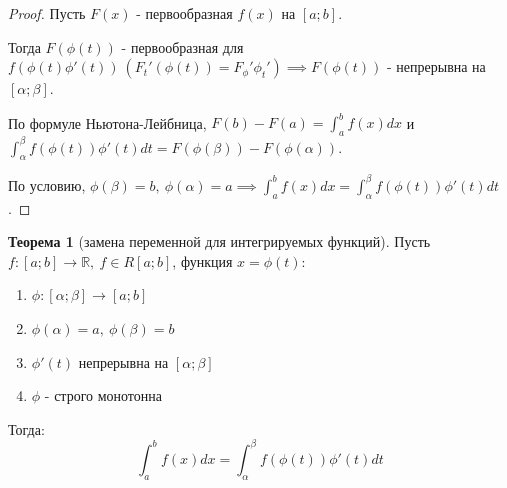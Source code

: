 \documentclass{report}
\theoremstyle{definition}
\newtheorem{theorem}{Теорема}[section]
\begin{document}
\begin{proof}
  Пусть $F(x)$ - первообразная $f(x)$ на $[a;b]$.

  Тогда $F(\phi(t))$ - первообразная для $f(\phi(t)\phi'(t)) \ (F_{t}'(\phi(t))
    = F_{\phi}'\phi_{t}') \implies F(\phi(t))$ - непрерывна на $[\alpha;\beta]$.

  По формуле Ньютона-Лейбница, $F(b) - F(a) = \int_{a}^{b}f(x)dx$ и $\int_{\alpha}
    ^{\beta}f(\phi(t))\phi'(t)dt = F(\phi(\beta)) - F(\phi(\alpha))$.

  По условию, $\phi(\beta) = b, \ \phi(\alpha) = a \implies \int_{a}^{b}f(x)dx =
    \int_{\alpha}^{\beta}f(\phi(t))\phi'(t)dt$.
\end{proof}

\begin{theorem}[замена переменной для интегрируемых функций]
  Пусть $f:[a;b]\rightarrow\mathbb{R}, \ f\in R[a;b]$, функция $x = \phi(t):$
  \begin{enumerate}
    \item $\phi:[\alpha;\beta]\rightarrow[a;b]$
    \item $\phi(\alpha)=a, \ \phi(\beta)=b$
    \item $\phi'(t)$ непрерывна на $[\alpha;\beta]$
    \item $\phi$ - строго монотонна
  \end{enumerate}
  Тогда:
  \begin{equation*}
    \int_{a}^{b}f(x)dx = \int_{\alpha}^{\beta}f(\phi(t))\phi'(t)dt
  \end{equation*}
\end{theorem}
\end{document}
